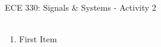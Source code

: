 \documentclass[12pt]{article}
\begin{document}
\begin{center}
{\large ECE 330: Signals \& Systems  -  Activity 2}
\mbox{ }\\
\mbox{ }\\
\end{center}


\begin{enumerate}[\qquad 1)]

\item First Item

\end{enumerate}
\end{document}
